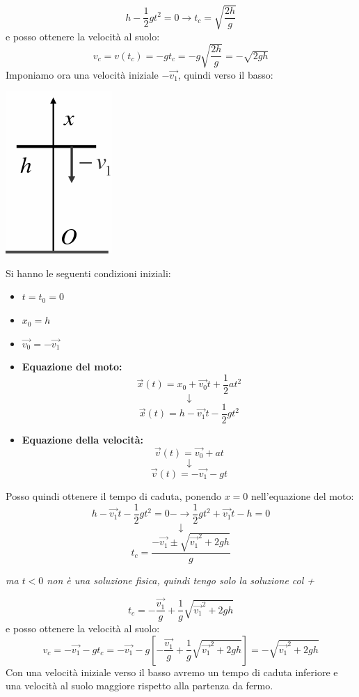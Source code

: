\documentclass[a4paper,12pt, oneside]{book}
\begin{document}
$$h-\frac{1}{2} g t^2=0\rightarrow t_c=\sqrt{\frac{2 h}{g}}$$
e posso ottenere la velocità al suolo:
$$v_c=v(t_c)=-g t_c=-g \sqrt{\frac{2 h}{g}}=-\sqrt{2 g h}$$
Imponiamo ora una velocità iniziale $-\vec{v_1}$, quindi verso il basso:
\begin{center}
	\includegraphics[scale=0.4]{img/vert2.png}
\end{center}
Si hanno le seguenti condizioni iniziali:
\begin{itemize}
	\item $t=t_0=0$
	\item $x_0=h$
	\item $\vec{v_0}=-\vec{v_1}$
\end{itemize}
\begin{itemize}
	\item \textbf{Equazione del moto:}
	      $$\vec{x}(t)=x_0+\vec{v_0} t+\frac{1}{2} a  t^2$$
	      $$\downarrow$$
	      $$\vec{x}(t)=h-\vec{v_1}t-\frac{1}{2} g t^2$$
	\item \textbf{Equazione della velocità:}
	      $$\vec{v}(t)=\vec{v_0}+a t$$
	      $$\downarrow$$
	      $$\vec{v}(t)=-\vec{v_1}-gt$$
\end{itemize}
Posso quindi ottenere il tempo di caduta, ponendo $x=0$ nell'equazione del moto:
$$h-\vec{v_1}t-\frac{1}{2} g t^2=0-\rightarrow \frac{1}{2} g t^2 +\vec{v_1}t-h=0$$
$$\downarrow$$
$$t_c=\frac{-\vec{v_1}\pm \sqrt{\vec{v_1}^2+2gh}}{g}$$
\begin{center}
	\textit{ma $t<0$ non è una soluzione fisica, quindi tengo solo la soluzione col +}
\end{center}
$$t_c=-\frac{\vec{v_1}}{g}+\frac{1}{g}\sqrt{\vec{v_1}^2+2gh}$$
e posso ottenere la velocità al suolo:
$$v_c=-\vec{v_1}-gt_c=-\vec{v_1}-g\left[-\frac{\vec{v_1}}{g}+\frac{1}{g}\sqrt{\vec{v_1}^2+2gh}\right]=-\sqrt{\vec{v_1}^2+2gh}$$
Con una velocità iniziale verso il basso avremo un tempo di caduta inferiore e una velocità al suolo maggiore rispetto alla partenza da fermo.\\
\end{document}
